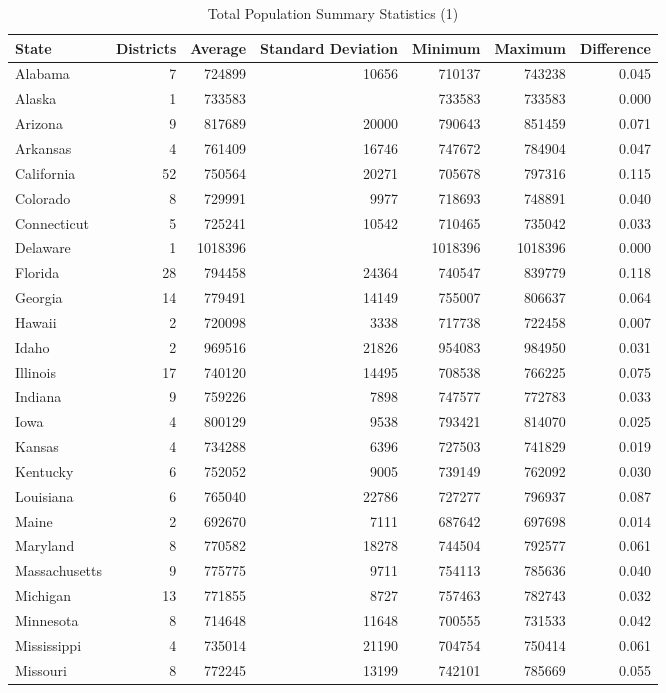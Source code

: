 \documentclass[12pt]{article}
\begin{document}
\begin{table}[ht!]
	\centering
	\caption{Total Population Summary Statistics (1)}
	\label{total_pop_stats1}
	\begin{adjustbox}{max width=\textwidth}
	\begin{tabular}{lrrrrrr}
	  \hline
	 State & Districts & Average  & Standard Deviation & Minimum & Maximum & Difference \\ 
	  \hline
	 Alabama & 7 & 724899 & 10656 & 710137 & 743238 & 0.045 \\ 
	   Alaska & 1 & 733583 &  & 733583 & 733583 & 0.000 \\ 
	  Arizona & 9 & 817689 & 20000 & 790643 & 851459 & 0.071 \\ 
	   Arkansas & 4 & 761409 & 16746 & 747672 & 784904 & 0.047 \\ 
	   California & 52 & 750564 & 20271 & 705678 & 797316 & 0.115 \\ 
	   Colorado & 8 & 729991 & 9977 & 718693 & 748891 & 0.040 \\ 
	  Connecticut & 5 & 725241 & 10542 & 710465 & 735042 & 0.033 \\ 
	  Delaware & 1 & 1018396 &  & 1018396 & 1018396 & 0.000 \\ 
	  Florida & 28 & 794458 & 24364 & 740547 & 839779 & 0.118 \\ 
	   Georgia & 14 & 779491 & 14149 & 755007 & 806637 & 0.064 \\ 
	   Hawaii & 2 & 720098 & 3338 & 717738 & 722458 & 0.007 \\ 
	   Idaho & 2 & 969516 & 21826 & 954083 & 984950 & 0.031 \\ 
	   Illinois & 17 & 740120 & 14495 & 708538 & 766225 & 0.075 \\ 
	  Indiana & 9 & 759226 & 7898 & 747577 & 772783 & 0.033 \\ 
	   Iowa & 4 & 800129 & 9538 & 793421 & 814070 & 0.025 \\ 
	   Kansas & 4 & 734288 & 6396 & 727503 & 741829 & 0.019 \\ 
	   Kentucky & 6 & 752052 & 9005 & 739149 & 762092 & 0.030 \\ 
	  Louisiana & 6 & 765040 & 22786 & 727277 & 796937 & 0.087 \\ 
	   Maine & 2 & 692670 & 7111 & 687642 & 697698 & 0.014 \\ 
	 Maryland & 8 & 770582 & 18278 & 744504 & 792577 & 0.061 \\ 
	   Massachusetts & 9 & 775775 & 9711 & 754113 & 785636 & 0.040 \\ 
	   Michigan & 13 & 771855 & 8727 & 757463 & 782743 & 0.032 \\ 
	 Minnesota & 8 & 714648 & 11648 & 700555 & 731533 & 0.042 \\ 
	 Mississippi & 4 & 735014 & 21190 & 704754 & 750414 & 0.061 \\ 
	 Missouri & 8 & 772245 & 13199 & 742101 & 785669 & 0.055 \\ 
	   
	   \hline
	\end{tabular}
	\end{adjustbox}
	\end{table}
\end{document}

